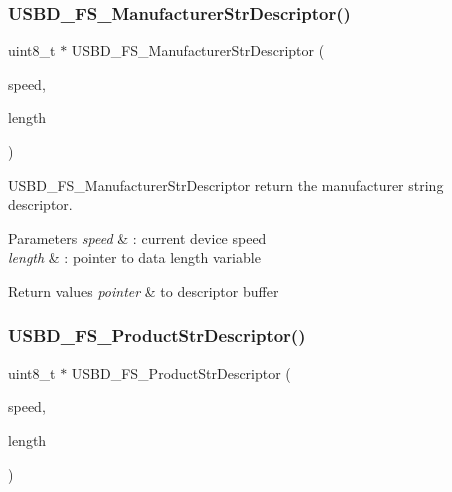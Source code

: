 \subsubsection{\texorpdfstring{U\+S\+B\+D\+\_\+\+F\+S\+\_\+\+Manufacturer\+Str\+Descriptor()}{USBD\_FS\_ManufacturerStrDescriptor()}}
{\footnotesize\ttfamily uint8\+\_\+t $\ast$ U\+S\+B\+D\+\_\+\+F\+S\+\_\+\+Manufacturer\+Str\+Descriptor (\begin{DoxyParamCaption}\item[{U\+S\+B\+D\+\_\+\+Speed\+Type\+Def}]{speed,  }\item[{uint16\+\_\+t $\ast$}]{length }\end{DoxyParamCaption})}



U\+S\+B\+D\+\_\+\+F\+S\+\_\+\+Manufacturer\+Str\+Descriptor return the manufacturer string descriptor. 


\begin{DoxyParams}{Parameters}
{\em speed} & \+: current device speed \\
\hline
{\em length} & \+: pointer to data length variable \\
\hline
\end{DoxyParams}

\begin{DoxyRetVals}{Return values}
{\em pointer} & to descriptor buffer \\
\hline
\end{DoxyRetVals}
\hypertarget{group___u_s_b_d___d_e_s_c___private___functions_ga0ec558c0303daabb851d584109a56514}{}\label{group___u_s_b_d___d_e_s_c___private___functions_ga0ec558c0303daabb851d584109a56514} 
\subsubsection{\texorpdfstring{U\+S\+B\+D\+\_\+\+F\+S\+\_\+\+Product\+Str\+Descriptor()}{USBD\_FS\_ProductStrDescriptor()}}
{\footnotesize\ttfamily uint8\+\_\+t $\ast$ U\+S\+B\+D\+\_\+\+F\+S\+\_\+\+Product\+Str\+Descriptor (\begin{DoxyParamCaption}\item[{U\+S\+B\+D\+\_\+\+Speed\+Type\+Def}]{speed,  }\item[{uint16\+\_\+t $\ast$}]{length }\end{DoxyParamCaption})}



